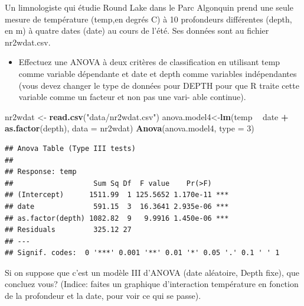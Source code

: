 \documentclass[12pt,]{book}
\newenvironment{Shaded}{\begin{snugshade}}{\end{snugshade}}
\newcommand{\DataTypeTok}[1]{\textcolor[rgb]{0.27,0.27,0.27}{#1}}
\newcommand{\DecValTok}[1]{\textcolor[rgb]{0.06,0.06,0.06}{#1}}
\newcommand{\KeywordTok}[1]{\textcolor[rgb]{0.27,0.27,0.27}{\textbf{#1}}}
\newcommand{\NormalTok}[1]{#1}
\newcommand{\OperatorTok}[1]{\textcolor[rgb]{0.43,0.43,0.43}{\textbf{#1}}}
\newcommand{\StringTok}[1]{\textcolor[rgb]{0.5,0.5,0.5}{#1}}
\providecommand{\tightlist}{%
  \setlength{\itemsep}{0pt}\setlength{\parskip}{0pt}}
\begin{document}
Un limnologiste qui étudie Round Lake dans le Parc Algonquin prend une seule mesure de température (temp,en degrés C) à 10 profondeurs différentes (depth, en m) à quatre dates (date) au cours de l'été. Ses données sont au fichier nr2wdat.csv.

\begin{itemize}
\tightlist
\item
  Effectuez une ANOVA à deux critères de classification en utilisant temp comme variable dépendante et date et depth comme variables indépendantes (vous devez changer le type de données pour DEPTH pour que R traite cette variable comme un facteur et non pas une vari- able continue).
\end{itemize}

\begin{Shaded}
\begin{Highlighting}[]
\NormalTok{nr2wdat <-}\StringTok{ }\KeywordTok{read.csv}\NormalTok{(}\StringTok{"data/nr2wdat.csv"}\NormalTok{)}
\NormalTok{anova.model4<-}\KeywordTok{lm}\NormalTok{(temp }\OperatorTok{~}\StringTok{ }\NormalTok{date }\OperatorTok{+}\StringTok{ }\KeywordTok{as.factor}\NormalTok{(depth), }\DataTypeTok{data =}\NormalTok{ nr2wdat)}
\KeywordTok{Anova}\NormalTok{(anova.model4, }\DataTypeTok{type =} \DecValTok{3}\NormalTok{)}
\end{Highlighting}
\end{Shaded}

\begin{verbatim}
## Anova Table (Type III tests)
## 
## Response: temp
##                   Sum Sq Df  F value    Pr(>F)    
## (Intercept)      1511.99  1 125.5652 1.170e-11 ***
## date              591.15  3  16.3641 2.935e-06 ***
## as.factor(depth) 1082.82  9   9.9916 1.450e-06 ***
## Residuals         325.12 27                       
## ---
## Signif. codes:  0 '***' 0.001 '**' 0.01 '*' 0.05 '.' 0.1 ' ' 1
\end{verbatim}

Si on suppose que c'est un modèle III d'ANOVA (date aléatoire, Depth fixe), que concluez vous? (Indice: faites un graphique d'interaction température en fonction de la profondeur et la date, pour voir ce qui se passe).

\begin{Shaded}
\end{Shaded}
\end{document}

